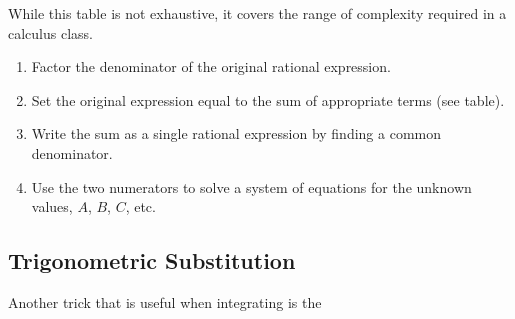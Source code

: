 While this table is not exhaustive, it covers the range of complexity required in a calculus class.

\begin{strat}
    
\begin{enumerate}
  \item Factor the denominator of the original rational expression.
  \item Set the original expression equal to the sum of appropriate terms (see table).
  \item Write the sum as a single rational expression by finding a common denominator.
  \item Use the two numerators to solve a system of equations for the unknown values, $A$, $B$, $C$, etc.
\end{enumerate}
\end{strat}



\subsection{Trigonometric Substitution}

Another trick that is useful when integrating is the 



